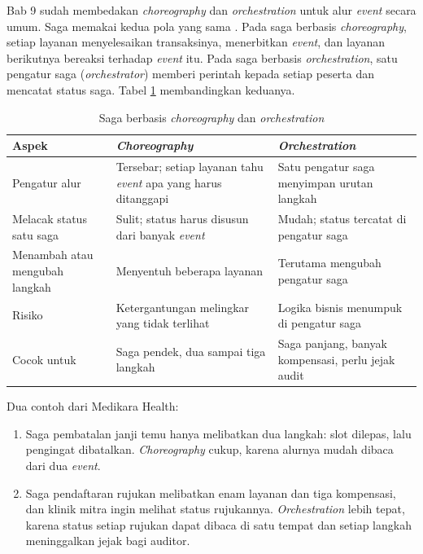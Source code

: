 Bab 9 sudah membedakan \textit{choreography} dan \textit{orchestration} untuk alur
\textit{event} secara umum. Saga memakai kedua pola yang sama \cite{c10-richardson-saga}. Pada saga
berbasis \textit{choreography}, setiap layanan menyelesaikan transaksinya, menerbitkan
\textit{event}, dan layanan berikutnya bereaksi terhadap \textit{event} itu. Pada saga berbasis
\textit{orchestration}, satu pengatur saga (\textit{orchestrator}) memberi perintah kepada setiap
peserta dan mencatat status saga. Tabel \ref{tab:ch10-koordinasi-saga} membandingkan keduanya.

\begin{table}[!htb]
  \centering
  \caption{Saga berbasis \textit{choreography} dan \textit{orchestration}}
  \label{tab:ch10-koordinasi-saga}
  \footnotesize
  \begin{tabularx}{\textwidth}{>{\raggedright\arraybackslash}p{2.6cm} >{\raggedright\arraybackslash}X >{\raggedright\arraybackslash}X}
    \hline
    \textbf{Aspek} & \textbf{\textit{Choreography}} & \textbf{\textit{Orchestration}} \\ \hline
    Pengatur alur & Tersebar; setiap layanan tahu \textit{event} apa yang harus ditanggapi &
      Satu pengatur saga menyimpan urutan langkah \\ \hline
    Melacak status satu saga & Sulit; status harus disusun dari banyak \textit{event} & Mudah;
      status tercatat di pengatur saga \\ \hline
    Menambah atau mengubah langkah & Menyentuh beberapa layanan & Terutama mengubah pengatur
      saga \\ \hline
    Risiko & Ketergantungan melingkar yang tidak terlihat & Logika bisnis menumpuk di pengatur
      saga \\ \hline
    Cocok untuk & Saga pendek, dua sampai tiga langkah & Saga panjang, banyak kompensasi, perlu
      jejak audit \\ \hline
  \end{tabularx}
\end{table}

Dua contoh dari Medikara Health:
\begin{enumerate}
  \item Saga pembatalan janji temu hanya melibatkan dua langkah: slot dilepas, lalu pengingat
        dibatalkan. \textit{Choreography} cukup, karena alurnya mudah dibaca dari dua
        \textit{event}.
  \item Saga pendaftaran rujukan melibatkan enam layanan dan tiga kompensasi, dan klinik mitra
        ingin melihat status rujukannya. \textit{Orchestration} lebih tepat, karena status setiap
        rujukan dapat dibaca di satu tempat dan setiap langkah meninggalkan jejak bagi auditor.
\end{enumerate}

